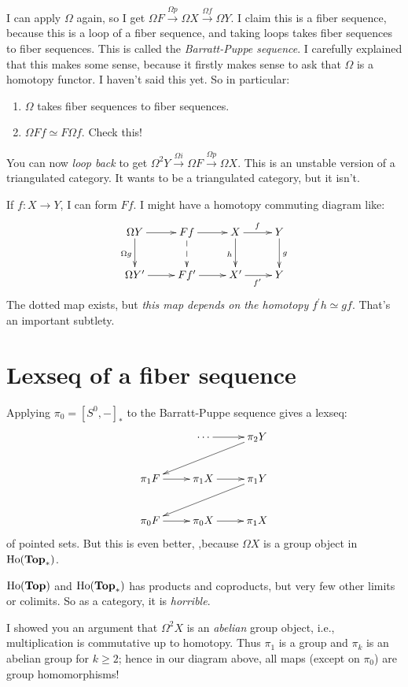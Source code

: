 I can apply $\Omega$ again, so I get $\Omega F\xrightarrow{\Omega p} \Omega X\xrightarrow{\Omega f} \Omega Y$. I claim this is a fiber sequence, because this is a loop of a fiber sequence, and taking loops takes fiber sequences to fiber sequences. This is called the \emph{Barratt-Puppe sequence}. I carefully explained that this makes some sense, because it firstly makes sense to ask that $\Omega$ is a homotopy functor. I haven't said this yet. So in particular:
\begin{enumerate}
    \item $\Omega$ takes fiber sequences to fiber sequences.
    \item $\Omega Ff\simeq F\Omega f$. Check this!
\end{enumerate}
You can now \emph{loop back} to get $\Omega^2 Y\xrightarrow{\Omega i} \Omega F\xrightarrow{\Omega p}\Omega X$. This is an unstable version of a triangulated category. It wants to be a triangulated category, but it isn't.
\begin{remark}
    If $f:X\to Y$, I can form $Ff$. I might have a homotopy commuting diagram like:
    \begin{equation*}
	\xymatrix{
	    \Omega Y\ar[d]_{\Omega g}\ar[r] & Ff\ar@{-->}[d]\ar[r] & X\ar[d]_{h}\ar[r]^f & Y\ar[d]^g\\
	    \Omega Y^\prime\ar[r] & Ff^\prime\ar[r] & X^\prime\ar[r]_{f^\prime} & Y
	    }
    \end{equation*}
    The dotted map exists, but \emph{this map depends on the homotopy} $f^\prime h\simeq gf$. That's an important subtlety.
\end{remark}
\section{Lexseq of a fiber sequence}
Applying $\pi_0 = [S^0,-]_\ast$ to the Barratt-Puppe sequence gives a lexseq:
\begin{equation*}
    \xymatrix{
	& \cdots\ar[r] & \pi_2 Y\ar[dll]\\
	\pi_1 F\ar[r] & \pi_1 X\ar[r] & \pi_1 Y\ar[dll]\\
	\pi_0 F\ar[r] & \pi_0 X\ar[r] & \pi_1 X
    }
\end{equation*}
of pointed sets. But this is even better, ,because $\Omega X$ is a group object in $\mathrm{Ho}(\mathbf{Top}_\ast)$.
\begin{remark}
    $\mathrm{Ho}(\mathbf{Top})$ and $\mathrm{Ho}(\mathbf{Top}_\ast)$ has products and coproducts, but very few other limits or colimits. So as a category, it is \emph{horrible}.
\end{remark}
I showed you an argument that $\Omega^2 X$ is an \emph{abelian} group object, i.e., multiplication is commutative up to homotopy. Thus $\pi_1$ is a group and $\pi_k$ is an abelian group for $k\geq 2$; hence in our diagram above, all maps (except on $\pi_0$) are group homomorphisms!

